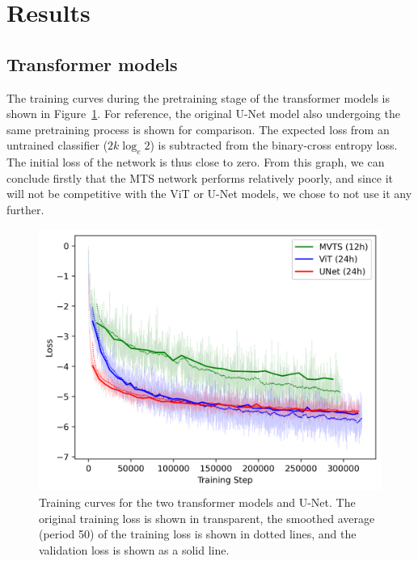 \section{Results}
\label{sec:results}

\subsection{Transformer models}

The training curves during the pretraining stage of the transformer models is shown in Figure~\ref{fig:pretain_loss_curve}. For reference, the original U-Net model also undergoing the same pretraining process is shown for comparison. The expected loss from an untrained classifier ($2k\log_e2$) is subtracted from the binary-cross entropy loss. The initial loss of the network is thus close to zero. From this graph, we can conclude firstly that the MTS network performs relatively poorly, and since it will not be competitive with the ViT or U-Net models, we chose to not use it any further. 

\begin{figure}[htb]
  \centering
  \includegraphics[width=1\linewidth]{media/images/Pretraining_loss_curve.png}
  \caption{Training curves for the two transformer models and U-Net. The original training loss is shown in transparent, the smoothed average (period 50) of the training loss is shown in dotted lines, and the validation loss is shown as a solid line.}
  \label{fig:pretain_loss_curve}
  \myvspacecommand
\end{figure}

